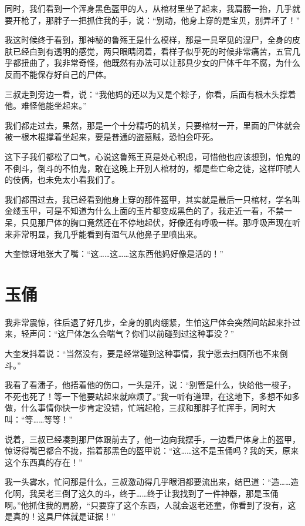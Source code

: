 同时，我们看到一个浑身黑色盔甲的人，从棺材里坐了起来，我肩膀一抬，几乎就要开枪了，那胖子一把抓住我的手，说：“别动，他身上穿的是宝贝，别弄坏了！”

我这时候终于看到，那神秘的鲁殇王是什么模样，那是一具罕见的湿尸，全身的皮肤已经白到有透明的感觉，两只眼睛闭着，看样子似乎死的时候非常痛苦，五官几乎都扭曲了，我非常奇怪，他既然有办法可以让那具少女的尸体千年不腐，为什么反而不能保存好自己的尸体。

三叔走到旁边一看，说：“我他妈的还以为又是个粽子，你看，后面有根木头撑着他。难怪他能坐起来。”

我们都走过去，果然，那是一个十分精巧的机关，只要棺材一开，里面的尸体就会被一根木棍撑着坐起来，要是普通的盗墓贼，恐怕会吓死。

这下子我们都松了口气，心说这鲁殇王真是处心积虑，可惜他也应该想到，怕鬼的不倒斗，倒斗的不怕鬼，敢在这晚上开别人棺材的，都是些亡命之徒，这样吓唬人的伎俩，也未免太小看我们了。

我们都围过去，我已经看到他身上穿的那件盔甲，其实就是最后一只棺材，学名叫金缕玉甲，可是不知道为什么上面的玉片都变成黑色的了，我走近一看，不禁一呆，只见那尸体的胸口竟然还在不停地起伏，好像还有呼吸一样。那呼吸声现在听来非常明显，我几乎能看到有湿气从他鼻子里喷出来。

大奎惊讶地张大了嘴：“这……这……这东西他妈好像是活的！”

\chapter{玉俑}

我非常震惊，往后退了好几步，全身的肌肉绷紧，生怕这尸体会突然间站起来扑过来，轻声问：“这尸体怎么会喘气？你们以前碰到过这种事没？”

大奎发抖着说：“当然没有，要是经常碰到这种事情，我宁愿去扫厕所也不来倒斗。”

我看了看潘子，他捂着他的伤口，一头是汗，说：“别管是什么，快给他一梭子，不死也死了！等一下他要站起来就麻烦了。”我一听有道理，在这地下，多想不如多做，什么事情你快一步肯定没错，忙端起枪，三叔和那胖子忙挥手，同时大叫：“等……等等！”

说着，三叔已经凑到那尸体跟前去了，他一边向我摆手，一边看尸体身上的盔甲，惊讶得嘴巴都合不拢，指着那黑色的盔甲说：“这……这不是玉俑吗？我的天，原来这个东西真的存在！”

我一头雾水，忙问那是什么，三叔激动得几乎眼泪都要流出来，结巴道：“造……造化啊，我吴老三倒了这久的斗，终于……终于让我找到了一件神器，那是玉俑啊。”他抓住我的肩膀，“只要穿了这个东西，人就会返老还童，你看到了没有，这是真的！这具尸体就是证据！”

